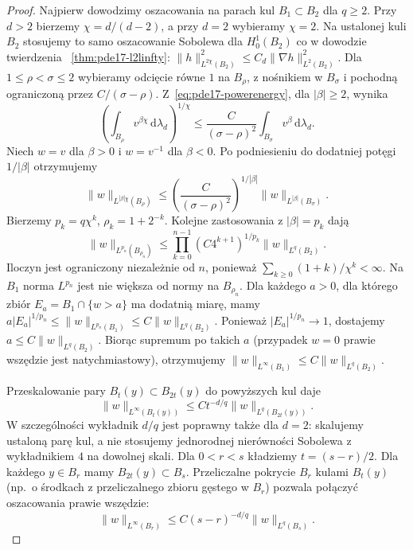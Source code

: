 \begin{proof}
Najpierw dowodzimy oszacowania na parach kul $B_1\subset B_2$
dla $q\ge2$. Przy $d>2$ bierzemy $\chi=d/(d-2)$, a przy
$d=2$ wybieramy $\chi=2$. Na ustalonej kuli $B_2$ stosujemy to samo oszacowanie
Sobolewa dla $H_0^1(B_2)$ co w dowodzie twierdzenia
~\ref{thm:pde17-l2linfty}:
$\|h\|_{L^{2\chi}(B_2)}^2\le C_d\|\nabla h\|_{L^2(B_2)}^2$.
Dla $1\le\rho<\sigma\le2$ wybieramy odcięcie równe $1$
na $B_\rho$, z nośnikiem w $B_\sigma$ i pochodną ograniczoną
przez $C/(\sigma-\rho)$. Z~\eqref{eq:pde17-powerenergy},
dla $|\beta|\ge2$, wynika
\[
 \left(\int_{B_\rho}v^{\beta\chi}\,\mathrm d\lambda_d\right)^{1/\chi}
 \le\frac{C}{(\sigma-\rho)^2}
 \int_{B_\sigma}v^\beta\,\mathrm d\lambda_d.
\]
Niech $w=v$ dla $\beta>0$ i $w=v^{-1}$ dla $\beta<0$.
Po podniesieniu do dodatniej potęgi $1/|\beta|$ otrzymujemy
\[
 \|w\|_{L^{|\beta|\chi}(B_\rho)}
 \le\left(\frac{C}{(\sigma-\rho)^2}\right)^{1/|\beta|}
       \|w\|_{L^{|\beta|}(B_\sigma)}.
\]
Bierzemy $p_k=q\chi^k$, $\rho_k=1+2^{-k}$.
Kolejne zastosowania z $|\beta|=p_k$ dają
\[
 \|w\|_{L^{p_n}(B_{\rho_n})}
 \le \prod_{k=0}^{n-1}(C4^{k+1})^{1/p_k}
        \|w\|_{L^q(B_2)}.
\]
Iloczyn jest ograniczony niezależnie od $n$, ponieważ
$\sum_{k\ge0}(1+k)/\chi^k<\infty$.
Na $B_1$ norma $L^{p_n}$ jest nie większa od normy na
$B_{\rho_n}$. Dla każdego $a>0$, dla którego zbiór
$E_a=B_1\cap\{w>a\}$ ma dodatnią miarę, mamy
$a|E_a|^{1/p_n}\le\|w\|_{L^{p_n}(B_1)}
\le C\|w\|_{L^q(B_2)}$.
Ponieważ $|E_a|^{1/p_n}\to1$, dostajemy
$a\le C\|w\|_{L^q(B_2)}$. Biorąc supremum po takich
$a$ (przypadek $w=0$ prawie wszędzie jest natychmiastowy),
otrzymujemy $\|w\|_{L^\infty(B_1)}\le C\|w\|_{L^q(B_2)}$.

Przeskalowanie pary $B_t(y)\subset B_{2t}(y)$ do powyższych
kul daje
\[
 \|w\|_{L^\infty(B_t(y))}
 \le C t^{-d/q}\|w\|_{L^q(B_{2t}(y))}.
\]
W szczególności wykładnik $d/q$ jest poprawny także dla $d=2$:
skalujemy ustaloną parę kul, a nie stosujemy jednorodnej
nierówności Sobolewa z wykładnikiem $4$ na dowolnej skali.
Dla $0<r<s$ kładziemy $t=(s-r)/2$. Dla każdego $y\in B_r$
mamy $B_{2t}(y)\subset B_s$. Przeliczalne pokrycie $B_r$
kulami $B_t(y)$ (np.\ o środkach z przeliczalnego zbioru
gęstego w $B_r$) pozwala połączyć oszacowania prawie wszędzie:
\[
 \|w\|_{L^\infty(B_r)}
 \le C(s-r)^{-d/q}\|w\|_{L^q(B_s)}.
\]


\end{proof}
